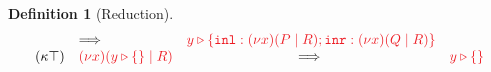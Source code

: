 \documentclass[draft,submission,copyright,creativecommons]{eptcs}
\newtheorem{definition}{Definition}
\begin{document}
\begin{definition}[Reduction]
\[\begin{array}{llcll}
      & \Longrightarrow \;
      & \tm{\cpCase{y}{\cpCut{x}{P}{R}}{\cpCut{x}{Q}{R}}}
      \\
      \cpRedKappaTop
      & \tm{\cpCut{x}{\cpAbsurd{y}}{R}}
      & \Longrightarrow \;
      & \tm{\cpAbsurd{y}}
    \end{array}
  \]
  \begin{center}
    \begin{prooftree*}
      \SYM{\cpRedGammaCut}
    \end{prooftree*}
    \begin{prooftree*}
      \SYM{\cpRedGammaEquiv}
    \end{prooftree*}
  \end{center}
\end{definition}
\end{document}
